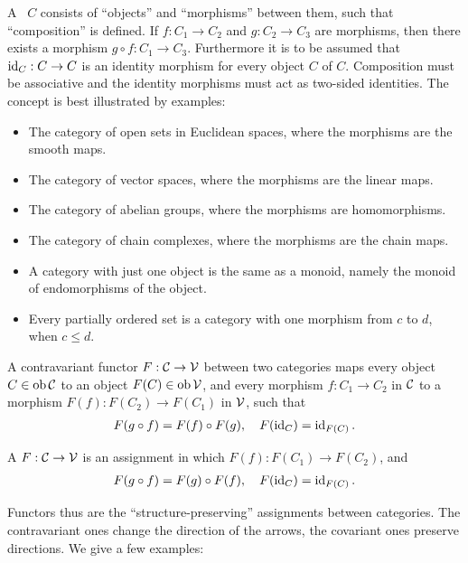 A \, $C$ consists of ``objects'' and ``morphisms'' between them, such that
``composition'' is defined. If $f:C_1\to C_2$ and $g:C_2\to C_3$ are morphisms, then
there exists a morphism $g\circ f: C_1\to C_3$. Furthermore it is to be assumed that
$\operatorname{id}_C: C\to C$ is an identity morphism for every object $C$ of $C$. Composition must be associative and the identity morphisms must act as two-sided identities. The concept is best illustrated
by examples:

\begin{itemize}
  \item The category of open sets in Euclidean spaces, where the morphisms are
        the smooth maps.
  \item The category of vector spaces, where the morphisms are the linear maps.
  \item The category of abelian groups, where the morphisms are homomorphisms.
  \item The category of chain complexes, where the morphisms are the chain maps.
  \item A category with just one object is the same as a monoid, namely the monoid of endomorphisms of the object.
  \item Every partially ordered set is a category with one morphism from $c$ to $d$, when $c\le d$.
\end{itemize}

A contravariant functor $F:\mathcal{C}\to \mathcal{V}$ between two categories maps every object
$C\in\operatorname{ob}\mathcal{C}$ to an object $F(C)\in\operatorname{ob}\mathcal{V}$, and every morphism $f:C_1\to C_2$ in $\mathcal{C}$ to
a morphism $F(f):F(C_2)\to F(C_1)$ in $\mathcal{V}$, such that
\begin{align*}
  F(g\circ f)=F(f)\circ F(g),\quad F(\operatorname{id}_C)=\operatorname{id}_{F(C)}.
\end{align*}

A  $F:\mathcal{C}\to\mathcal{V}$ is an assignment in which $F(f):F(C_1)\to F(C_2)$, and
\begin{align*}
  F(g\circ f)=F(g)\circ F(f),\quad F(\operatorname{id}_C)=\operatorname{id}_{F(C)}.
\end{align*}

Functors thus are the ``structure-preserving'' assignments between categories. The
contravariant ones change the direction of the arrows, the covariant ones preserve
directions. We give a few examples:

